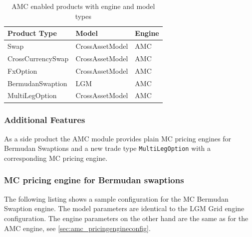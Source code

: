 \documentclass[12pt, a4paper]{article}
\begin{document}
\begin{table}[hbt]
  \begin{tabular}{l|l|l}
    Product Type & Model & Engine \\ \hline
    Swap & CrossAssetModel & AMC \\
    CrossCurrencySwap & CrossAssetModel & AMC \\
    FxOption & CrossAssetModel & AMC \\
    BermudanSwaption & LGM & AMC \\
    MultiLegOption & CrossAssetModel & AMC \\
  \end{tabular}
  \caption{AMC enabled products with engine and model types}
  \label{tbl:amcconfig}
\end{table}

\subsubsection*{Additional Features}
\label{sec:amc_sideproducts}

As a side product the AMC module provides plain MC pricing engines for Bermudan Swaptions and a new trade type
\verb+MultiLegOption+ with a corresponding MC pricing engine.

\subsubsection*{MC pricing engine for Bermudan swaptions}\label{sec:mc_bermudan_engine}

The following listing shows a sample configuration for the MC Bermudan Swaption engine. The model parameters are
identical to the LGM Grid engine configuration. The engine parameters on the other hand are the same as for the AMC
engine, see \ref{sec:amc_pricingengineconfig}.
\end{document}
